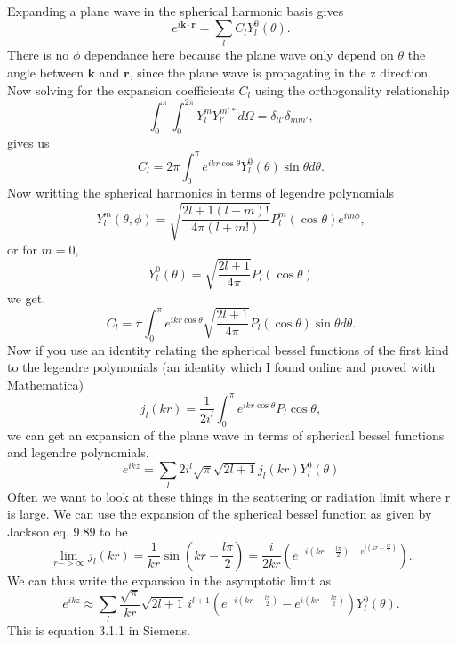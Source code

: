 Expanding a plane wave in the spherical harmonic basis gives
\begin{equation}
   e^{i\mathbf{k}\cdot\mathbf{r}} = \sum\limits_l C_l Y_l^0(\theta).
\end{equation}
There is no $\phi$ dependance here because the plane wave only depend on $\theta$ the angle between $\mathbf{k}$ and $\mathbf{r}$, since the plane wave is propagating in the z direction. Now solving for the expansion coefficients $C_l$ using the orthogonality relationship
\begin{equation}
   \int_0^{\pi} \int_0^{2\pi} Y_l^m Y_{l'}^{m'*} d\Omega = \delta_{ll'}\delta_{mm'},
\end{equation}
gives us
\begin{equation}
   C_l = 2\pi \int_0^{\pi} e^{ikr\cos\theta}Y_l^0(\theta)\sin\theta d\theta.
\end{equation}
Now writting the spherical harmonics in terms of legendre polynomials
\begin{equation}
   Y_l^m(\theta,\phi) = \sqrt{\frac{2l+1(l-m)!}{4\pi(l+m!)}}P_l^m(\cos\theta)e^{im\phi},
\end{equation}
or for $m=0$,
\begin{equation}
   Y_l^0(\theta)=\sqrt{\frac{2l+1}{4\pi}}P_l(\cos\theta)
\end{equation}
we get,
\begin{equation}
   C_l = \pi \int_0^\pi e^{ikr\cos\theta}\sqrt{\frac{2l+1}{4\pi}}P_l(\cos\theta) \sin\theta d\theta.
\end{equation}
Now if you use an identity relating the spherical bessel functions of the first kind to the legendre polynomials (an identity which I found online and proved with Mathematica)
\begin{equation}
   j_l(kr)=\frac{1}{2i^l}\int_0^\pi e^{ikr\cos\theta}P_l{\cos\theta},
\end{equation}
we can get an expansion of the plane wave in terms of spherical bessel functions and legendre polynomials.
\begin{equation}
   \boxed{e^{ikz} = \sum\limits_l 2i^l \sqrt{\pi}\sqrt{2l+1} j_l(kr)Y_l^0(\theta)}
\end{equation}
Often we want to look at these things in the scattering or radiation limit where r is large. We can use the expansion of the spherical bessel function as given by Jackson eq. 9.89 to be
\begin{equation}
   \lim\limits_{r->\infty} j_l(kr) = \frac{1}{kr} \sin\left( kr-\frac{l\pi}{2} \right) = \frac{i}{2kr}(e^{-i(kr-\frac{l\pi}{2}) - e^{i(kr-\frac{l\pi}{2})}}).
\end{equation}
We can thus write the expansion in the asymptotic limit as
\begin{equation}
   \boxed{e^{ikz} \approx \sum\limits_l \frac{\sqrt{\pi}}{kr} \sqrt{2l+1} \, i^{l+1} \left( e^{-i(kr-\frac{l\pi}{2})} - e^{i(kr-\frac{l\pi}{2})} \right) Y_l^0(\theta)}.
\end{equation}
This is equation 3.1.1 in Siemens.
